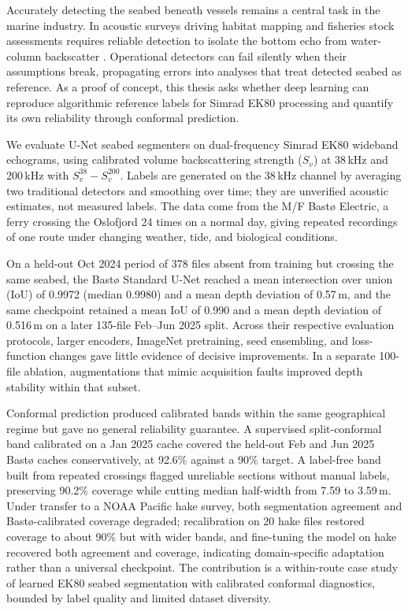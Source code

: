 
Accurately detecting the seabed beneath vessels remains a central task in the marine industry. In acoustic surveys driving habitat mapping and fisheries stock assessments requires reliable detection to isolate the bottom echo from water-column backscatter \cite{kenny_overview_2003,ona_mitson_1996,thomas_trawl_2024}. Operational detectors can fail silently when their assumptions break, propagating errors into analyses that treat detected seabed as reference. As a proof of concept, this thesis asks whether deep learning can reproduce algorithmic reference labels for Simrad EK80 processing and quantify its own reliability through conformal prediction.

We evaluate U-Net seabed segmenters on dual-frequency Simrad EK80 wideband echograms, using calibrated volume backscattering strength ($S_v$) at 38\,kHz and 200\,kHz with $S_v^{38}-S_v^{200}$. Labels are generated on the 38\,kHz channel by averaging two traditional detectors and smoothing over time; they are unverified acoustic estimates, not measured labels. The data come from the M/F Bast\o{} Electric, a ferry crossing the Oslofjord 24 times on a normal day, giving repeated recordings of one route under changing weather, tide, and biological conditions.

On a held-out Oct 2024 period of 378 files absent from training but crossing the same seabed, the Bast\o{} Standard U-Net reached a mean intersection over union (IoU) of 0.9972 (median 0.9980) and a mean depth deviation of 0.57\,m, and the same checkpoint retained a mean IoU of 0.990 and a mean depth deviation of 0.516\,m on a later 135-file Feb--Jun 2025 split. Across their respective evaluation protocols, larger encoders, ImageNet pretraining, seed ensembling, and loss-function changes gave little evidence of decisive improvements. In a separate 100-file ablation, augmentations that mimic acquisition faults improved depth stability within that subset.

Conformal prediction produced calibrated bands within the same geographical regime but gave no general reliability guarantee. A supervised split-conformal band calibrated on a Jan 2025 cache covered the held-out Feb and Jun 2025 Bast\o{} caches conservatively, at 92.6\% against a 90\% target. A label-free band built from repeated crossings flagged unreliable sections without manual labels, preserving 90.2\% coverage while cutting median half-width from 7.59 to 3.59\,m. Under transfer to a NOAA Pacific hake survey, both segmentation agreement and Bast\o{}-calibrated coverage degraded; recalibration on 20 hake files restored coverage to about 90\% but with wider bands, and fine-tuning the model on hake recovered both agreement and coverage, indicating domain-specific adaptation rather than a universal checkpoint. The contribution is a within-route case study of learned EK80 seabed segmentation with calibrated conformal diagnostics, bounded by label quality and limited dataset diversity.
